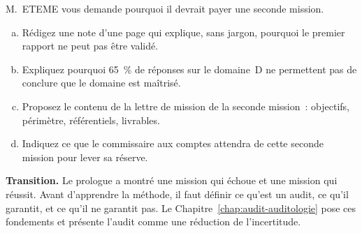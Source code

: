 \begin{boxexo}[title={\ding{45}\quad Exercice~P.3. La note au directeur général \niveauexpert}]
M.~ETEME vous demande pourquoi il devrait payer une seconde mission.
\begin{enumerate}[(a)]
    \item Rédigez une note d'une page qui explique, sans jargon, pourquoi le
          premier rapport ne peut pas être validé.
    \item Expliquez pourquoi 65~\% de réponses \OUI{} sur le domaine~D ne
          permettent pas de conclure que le domaine est maîtrisé.
    \item Proposez le contenu de la lettre de mission de la seconde mission~:
          objectifs, périmètre, référentiels, livrables.
    \item Indiquez ce que le commissaire aux comptes attendra de cette
          seconde mission pour lever sa réserve.
\end{enumerate}
\end{boxexo}

\bigskip

\begin{boxinfo}
\textbf{Transition.} Le prologue a montré une mission qui échoue et une
mission qui réussit. Avant d'apprendre la méthode, il faut définir ce
qu'est un audit, ce qu'il garantit, et ce qu'il ne garantit pas. Le
Chapitre~\ref{chap:audit-auditologie} pose ces fondements et présente
l'audit comme une réduction de l'incertitude.
\end{boxinfo}
